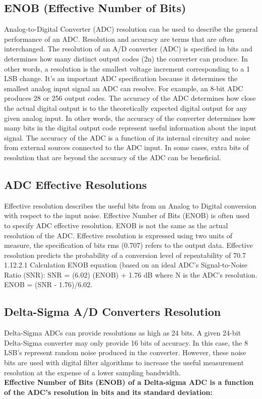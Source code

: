         \subsection{ENOB (Effective Number of Bits)}
        Analog-to-Digital Converter (ADC) resolution can be used to describe the general performance of an ADC. Resolution and accuracy are terms that are often interchanged.
The resolution of an A/D converter (ADC) is specified in bits and determines how many distinct output codes (2n) the converter can produce. In other words, a resolution is the smallest voltage increment corresponding to a 1 LSB change. It's an important ADC specification because it determines the smallest analog input signal an ADC can resolve.
For example, an 8-bit ADC produces 28 or 256 output codes. The accuracy of the ADC determines how close the actual digital output is to the theoretically expected digital output for any given analog input. In other words, the accuracy of the converter determines how many bits in the digital output code represent useful information about the input signal. The accuracy of the ADC is a function of its internal circuitry and noise from external sources connected to the ADC input. In some cases, extra bits of resolution that are beyond the accuracy of the ADC can be beneficial.\\

        \subsection{ADC Effective Resolutions}
        Effective resolution describes the useful bits from an Analog to Digital conversion with respect to the input noise. Effective Number of Bits (ENOB) is often used to specify ADC effective resolution. ENOB is not the same as the actual resolution of the ADC. Effective resolution is expressed using two units of measure, the specification of bits rms (0.707) refers to the output data. Effective resolution predicts the probability of a conversion level of repeatability of 70.7%
1.12.2.1	Calculation
ENOB equation (based on an ideal ADC’s Signal-to-Noise Ratio (SNR): SNR = (6.02) (ENOB) + 1.76 dB where N is the ADC’s resolution. ENOB = (SNR - 1.76)/6.02.

        \subsection{Delta-Sigma A/D Converters Resolution}
        Delta-Sigma ADCs can provide resolutions as high as 24 bits. A given 24-bit Delta-Sigma converter may only provide 16 bits of accuracy. In this case, the 8 LSB’s represent random noise produced in the converter. However, these noise bits are used with digital filter algorithms to increase the useful measurement resolution at the expense of a lower sampling bandwidth.\\
        \textbf{Effective Number of Bits (ENOB) of a Delta-sigma ADC is a function of the ADC's resolution in bits and its standard deviation:}
      
